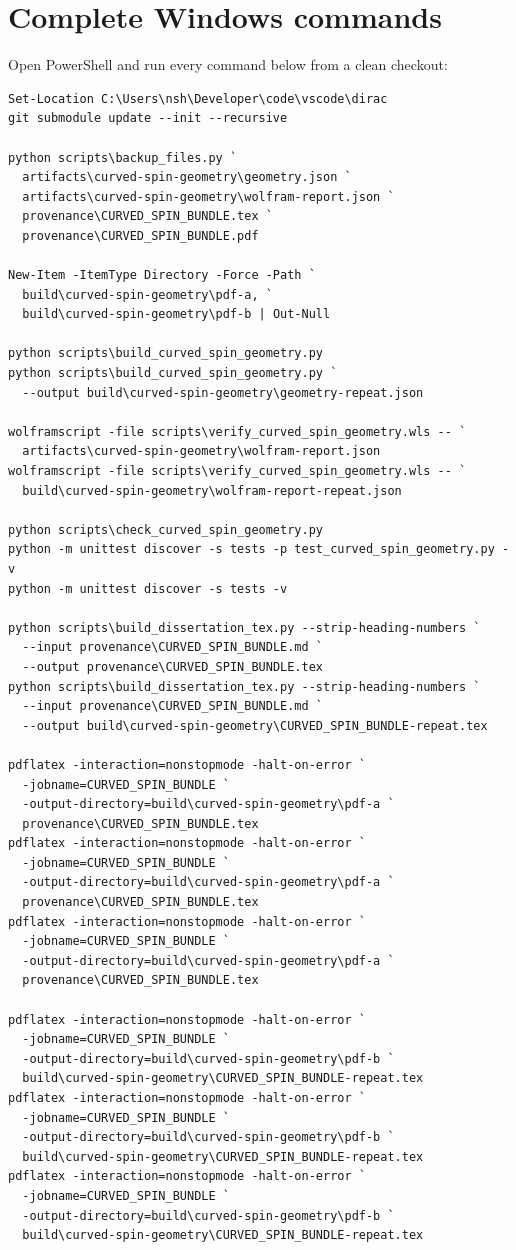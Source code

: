 \documentclass[11pt]{article}
\begin{document}
\section{Complete Windows commands}

Open PowerShell and run every command below from a clean checkout:

\begin{Verbatim}[fontsize=\small]
Set-Location C:\Users\nsh\Developer\code\vscode\dirac
git submodule update --init --recursive

python scripts\backup_files.py `
  artifacts\curved-spin-geometry\geometry.json `
  artifacts\curved-spin-geometry\wolfram-report.json `
  provenance\CURVED_SPIN_BUNDLE.tex `
  provenance\CURVED_SPIN_BUNDLE.pdf

New-Item -ItemType Directory -Force -Path `
  build\curved-spin-geometry\pdf-a, `
  build\curved-spin-geometry\pdf-b | Out-Null

python scripts\build_curved_spin_geometry.py
python scripts\build_curved_spin_geometry.py `
  --output build\curved-spin-geometry\geometry-repeat.json

wolframscript -file scripts\verify_curved_spin_geometry.wls -- `
  artifacts\curved-spin-geometry\wolfram-report.json
wolframscript -file scripts\verify_curved_spin_geometry.wls -- `
  build\curved-spin-geometry\wolfram-report-repeat.json

python scripts\check_curved_spin_geometry.py
python -m unittest discover -s tests -p test_curved_spin_geometry.py -v
python -m unittest discover -s tests -v

python scripts\build_dissertation_tex.py --strip-heading-numbers `
  --input provenance\CURVED_SPIN_BUNDLE.md `
  --output provenance\CURVED_SPIN_BUNDLE.tex
python scripts\build_dissertation_tex.py --strip-heading-numbers `
  --input provenance\CURVED_SPIN_BUNDLE.md `
  --output build\curved-spin-geometry\CURVED_SPIN_BUNDLE-repeat.tex

pdflatex -interaction=nonstopmode -halt-on-error `
  -jobname=CURVED_SPIN_BUNDLE `
  -output-directory=build\curved-spin-geometry\pdf-a `
  provenance\CURVED_SPIN_BUNDLE.tex
pdflatex -interaction=nonstopmode -halt-on-error `
  -jobname=CURVED_SPIN_BUNDLE `
  -output-directory=build\curved-spin-geometry\pdf-a `
  provenance\CURVED_SPIN_BUNDLE.tex
pdflatex -interaction=nonstopmode -halt-on-error `
  -jobname=CURVED_SPIN_BUNDLE `
  -output-directory=build\curved-spin-geometry\pdf-a `
  provenance\CURVED_SPIN_BUNDLE.tex

pdflatex -interaction=nonstopmode -halt-on-error `
  -jobname=CURVED_SPIN_BUNDLE `
  -output-directory=build\curved-spin-geometry\pdf-b `
  build\curved-spin-geometry\CURVED_SPIN_BUNDLE-repeat.tex
pdflatex -interaction=nonstopmode -halt-on-error `
  -jobname=CURVED_SPIN_BUNDLE `
  -output-directory=build\curved-spin-geometry\pdf-b `
  build\curved-spin-geometry\CURVED_SPIN_BUNDLE-repeat.tex
pdflatex -interaction=nonstopmode -halt-on-error `
  -jobname=CURVED_SPIN_BUNDLE `
  -output-directory=build\curved-spin-geometry\pdf-b `
  build\curved-spin-geometry\CURVED_SPIN_BUNDLE-repeat.tex


\end{Verbatim}
\end{document}
